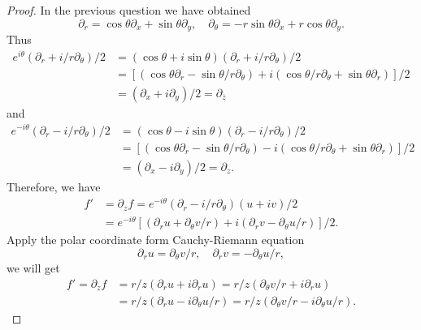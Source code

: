 \documentclass[12pt]{article}
\renewcommand{\(}{\left(}%
\renewcommand{\)}{\right)}%
\renewcommand{\[}{\left[}%
\renewcommand{\]}{\right]}%
\newtheorem{proof}{Proof.}}
\begin{document}
 \begin{proof}
 	In the previous question we have obtained 
 	\begin{equation*}
 		\partial_r=\cos\theta\partial_x+\sin\theta\partial_y,\quad \partial_\theta=-r\sin\theta\partial_x+r\cos\theta\partial_y.
 	\end{equation*}
 	Thus
 	\begin{equation*}
 		\begin{split}
 			e^{i\theta}(\partial_r+i/r\partial_\theta)/2&=(\cos\theta+i\sin\theta)(\partial_r+i/r\partial_\theta)/2\\
 			&=[(\cos\theta\partial_r-\sin\theta/r\partial_\theta)+i(\cos\theta/r\partial_\theta+\sin\theta\partial_r)]/2\\
 			&=(\partial_x+i\partial_y)/2=\partial_{\overline{z}}
 		\end{split}
 	\end{equation*}
 	and
 	\begin{equation*}
 		\begin{split}
 			e^{-i\theta}(\partial_r-i/r\partial_\theta)/2&=(\cos\theta-i\sin\theta)(\partial_r-i/r\partial_\theta)/2\\
 			&=[(\cos\theta\partial_r-\sin\theta/r\partial_\theta)-i(\cos\theta/r\partial_\theta+\sin\theta\partial_r)]/2\\
 			&=(\partial_x-i\partial_y)/2=\partial_{z}.
 		\end{split}
 	\end{equation*}
 	Therefore, we have
 	\begin{equation*}
 		\begin{split}
 			f'&=\partial_zf=e^{-i\theta}(\partial_r-i/r\partial_\theta)(u+iv)/2\\
 			&=e^{-i\theta}[(\partial_ru+\partial_\theta v/r)+i(\partial_rv-\partial_\theta u/r)]/2.
 		\end{split}
 	\end{equation*}
 	Apply the polar coordinate form Cauchy-Riemann equation 
 	\begin{equation*}
 		\partial_ru=\partial_\theta v/r,\quad \partial_rv=-\partial_\theta u/r,
 	\end{equation*}
 	we will get
 	\begin{equation*}
 		\begin{split}
 			f'=\partial_z f&= r/z(\partial_ru+i\partial_ru)=r/z(\partial_\theta v/r+i\partial_ru)\\
 			&=r/z(\partial_ru-i\partial_\theta u/r)=r/z(\partial_\theta v/r-i\partial_\theta u/r).
 		\end{split}
 	\end{equation*}
 \end{proof}
 
\end{document}
